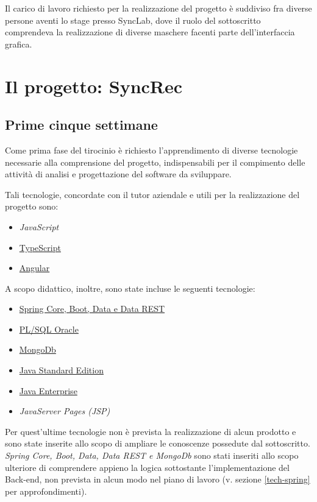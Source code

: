 Il carico di lavoro richiesto per la realizzazione del progetto è suddiviso fra diverse persone aventi lo stage presso SyncLab, dove il ruolo del sottoscritto comprendeva la realizzazione di diverse maschere facenti parte dell'interfaccia grafica.\\

\section{Il progetto: SyncRec}\label{ch-2.2}
\subsection{Prime cinque settimane}
Come prima fase del tirocinio è richiesto l'apprendimento di diverse tecnologie necessarie alla comprensione del progetto,  indispensabili per il compimento delle attività di analisi e progettazione del software da sviluppare.

Tali tecnologie, concordate con il tutor aziendale e utili per la realizzazione del progetto sono:
\begin{itemize}
	\item \textit{JavaScript}
	\item \hyperref[typescript]{TypeScript}
	\item \hyperref[angular]{Angular}
\end{itemize}

A scopo didattico, inoltre, sono state incluse le seguenti tecnologie:
\begin{itemize}
	\item \hyperref[tech-spring]{Spring Core, Boot, Data e Data REST}
	\item \hyperref[plsql]{PL/SQL Oracle}
	\item \hyperref[mongodb]{MongoDb}
	\item \hyperref[java]{Java Standard Edition}
	\item \hyperref[java]{Java Enterprise}
	\item \textit{JavaServer Pages (JSP)}
\end{itemize}


Per quest'ultime tecnologie non è prevista la realizzazione di alcun prodotto e sono state inserite allo scopo di ampliare le conoscenze possedute dal sottoscritto.\\
\textit{Spring Core, Boot, Data, Data REST e MongoDb} sono stati inseriti allo scopo ulteriore di comprendere appieno la logica sottostante l'implementazione del Back-end, non prevista in alcun modo nel piano di lavoro (v. sezione \ref{tech-spring} per approfondimenti).\\

